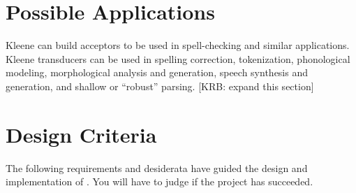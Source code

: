 \section{Possible Applications}

Kleene can build acceptors to be used in spell-checking and similar
applications.  Kleene transducers can be used in spelling correction,
tokenization, phonological modeling, morphological analysis and
generation, speech synthesis and generation, and shallow or ``robust''
parsing.  [KRB:  expand this section]

\section{Design Criteria}

The following requirements and desiderata have guided the design and
implementation of \Kleene{}.  You will have to judge if the project has
succeeded.

